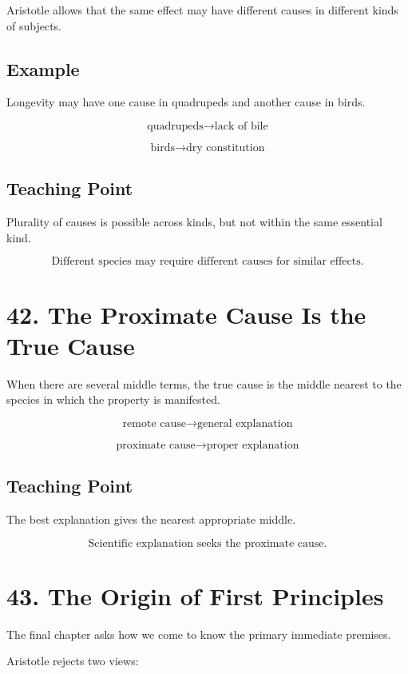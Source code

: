 \documentclass[12pt]{article}
\begin{document}
Aristotle allows that the same effect may have different causes in different
kinds of subjects.

\subsection*{Example}

Longevity may have one cause in quadrupeds and another cause in birds.

\[
\text{quadrupeds} \rightarrow \text{lack of bile}
\]

\[
\text{birds} \rightarrow \text{dry constitution}
\]

\subsection*{Teaching Point}

Plurality of causes is possible across kinds, but not within the same essential
kind.

\[
\boxed{
\text{Different species may require different causes for similar effects.}
}
\]

\section*{42. The Proximate Cause Is the True Cause}

When there are several middle terms, the true cause is the middle nearest to the
species in which the property is manifested.

\[
\text{remote cause} \rightarrow \text{general explanation}
\]

\[
\text{proximate cause} \rightarrow \text{proper explanation}
\]

\subsection*{Teaching Point}

The best explanation gives the nearest appropriate middle.

\[
\boxed{
\text{Scientific explanation seeks the proximate cause.}
}
\]

\section*{43. The Origin of First Principles}

The final chapter asks how we come to know the primary immediate premises.

Aristotle rejects two views:
\end{document}
